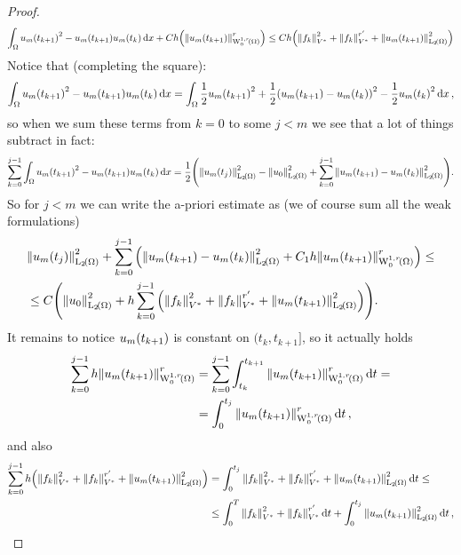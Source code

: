 \documentclass{article}
\begin{document}
\begin{proof}
	\begin{align*}
		\int_{\Omega}u_m\qty(t_{k+1})^{2} - u_m\qty(t_{k+1})u_m\qty(t_k)\dd{x} + Ch\qty(\norm{u_m\qty(t_{k+1})}_{\WkpzeroSet[1][r]{\Omega}}^r) \leq Ch\qty(\norm{f_k}_{V^{*}}^{2} + \norm{f_k}_{V^{*}}^{r'} + \norm{u_m\qty(t_{k+1})}_{\LpSet[2]{\Omega}}^{2}) 
	\end{align*}
	Notice that (completing the square):
	\[
		\int_{\Omega}u_m\qty(t_{k+1})^{2} - u_m\qty(t_{k+1})u_m\qty(t_k)\dd{x} = \int_{\Omega}\frac{1}{2}u_m\qty(t_{k+1})^{2} + \frac{1}{2}\qty(u_m\qty(t_{k+1})- u_m\qty(t_k))^{2} - \frac{1}{2} u_m\qty(t_k)^{2}\dd{x},
	\]
	so when we sum these terms from $k = 0$ to some $j < m$ we see that a lot of things subtract in fact:
	\[
		\sum_{k=0}^{j-1}\int_{\Omega}u_m\qty(t_{k+1})^{2} - u_m\qty(t_{k+1})u_m\qty(t_k)\dd{x} = \frac{1}{2}\qty(\norm{u_m\qty(t_j)}_{\LpSet[2]{\Omega}}^{2} - \norm{u_0}_{\LpSet[2]{\Omega}}^{2} + \sum_{k=0}^{j-1} \norm{u_m\qty(t_{k+1}) - u_m\qty(t_k)}_{\LpSet[2]{\Omega}}^{2}).
	\]
	So for $j < m$ we can write the a-priori estimate as (we of course sum all the weak formulations)
	\begin{align*}
		&\norm{u_m\qty(t_{j})}_{\LpSet[2]{\Omega}}^{2} + \sum_{k=0}^{j-1} \qty(\norm{u_m\qty(t_{k+1}) - u_m\qty(t_k)}_{\LpSet[2]{\Omega}}^{2} + C_1 h \norm{u_m\qty(t_{k+1})}_{\WkpzeroSet[1][r]{\Omega}}^r) \leq \\
		& \leq C\qty(\norm{u_0}_{\LpSet[2]{\Omega}}^{2} + h\sum_{k=0}^{j-1}\qty(\norm{f_k}_{V^{*}}^{2} + \norm{f_k}_{V^{*}}^{r'} + \norm{u_m\qty(t_{k+1})}_{\LpSet[2]{\Omega}}^{2})).
	\end{align*}
	It remains to notice $u_m\qty(t_{k+1})$ is constant on $(t_k, t_{k+1}]$, so it actually holds 
	\begin{align*}
		\sum_{k=0}^{j-1}h \norm{u_m\qty(t_{k+1})}_{\WkpzeroSet[1][r]{\Omega}}^r &= \sum_{k=0}^{j-1} \int_{t_k}^{t_{k+1}}\norm{u_m\qty(t_{k+1})}_{\WkpzeroSet[1][r]{\Omega}}^r\dd{t} = \\
											&= \int_{0}^{t_j}\norm{u_m\qty(t_{k+1})}_{\WkpzeroSet[1][r]{\Omega}}^r \dd{t}, 
	\end{align*}
	and also 
	\begin{align*}
		\sum_{k=0}^{j-1}h \qty(\norm{f_k}_{V^{*}}^{2} + \norm{f_k}_{V^{*}}^{r'} + \norm{u_m\qty(t_{k+1})}_{\LpSet[2]{\Omega}}^{2}) &= \int_0^{t_j}\norm{f_k}_{V^{*}}^{2} + \norm{f_k}_{V^{*}}^{r'} + \norm{u_m\qty(t_{k+1})}_{\LpSet[2]{\Omega}}^{2}\dd{t} \leq \\
																	   &\leq \int_0^{T}\norm{f_k}_{V^{*}}^{2} + \norm{f_k}_{V^{*}}^{r'}\dd{t} + \int_0^{t_j} \norm{u_m\qty(t_{k+1})}_{\LpSet[2]{\Omega}}^{2}\dd{t},

\end{align*}
\end{proof}
\end{document}
